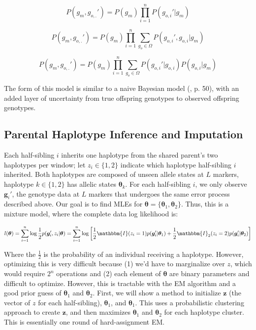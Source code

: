 \documentclass[11pt]{article}
\begin{document}
$$
P(g_m, g_{o,.}') = P(g_m) \prod_{i = 1}^n P(g_{o,i}' | g_m)
$$

$$
P(g_m, g_{o,.}') = P(g_m) \prod_{i = 1}^n \sum_{g_o \in \Omega} P(g_{o,i}', g_{o,i} | g_m)
$$

\begin{equation}
  P(g_m, g_{o,.}') = P(g_m) \prod_{i = 1}^n \sum_{g_o \in \Omega} P(g_{o,i}' | g_{o,i}) P(g_{o,i} | g_{m})
\end{equation}

The form of this model is similar to a naive Bayesian model
(\citealt{koller2009}, p. 50), with an added layer of uncertainty from true
offspring genotypes to observed offspring genotypes.

%
%

\subsection{Parental Haplotype Inference and Imputation}

Each half-sibling $i$ inherits one haplotype from the shared parent's two
haplotypes per window; let $z_i \in \{1, 2\}$ indicate which haplotype
half-sibling $i$ inherited. Both haplotypes are composed of unseen allele
states at $L$ markers, haplotype $k \in \{1, 2\}$ has allelic states
$\bm{\theta}_k$. For each half-sibling $i$, we only observe $\bm{g}_i'$, the
genotype data at $L$ markers that undergoes the same error process described
above. Our goal is to find MLEs for $\bm{\theta} = \{\bm{\theta}_1,
\bm{\theta}_2\}$. Thus, this is a mixture model, where the complete data log
likelihood is:

$$
l(\bm{\theta}) =  \sum_{i=1}^n \log \frac{1}{2} p(\bm{g}'_i, z_i | \bm{\theta}) = \sum_{i=1}^n \log \left[ \frac{1}{2}\mathbbm{I}(z_i = 1) p(\bm{g}'_i | \bm{\theta}_1) + \frac{1}{2}\mathbbm{I}_2(z_i = 2) p(\bm{g}'_i | \bm{\theta}_2) \right]
$$

Where the $\frac{1}{2}$ is the probability of an individual receiving a
haplotype. However, optimizing this is very difficult because (1) we'd have to
marginalize over $z$, which would require $2^n$ operations and (2) each element
of $\bm{\theta}$ are binary parameters and difficult to optimize. However, this
is tractable with the EM algorithm and a good prior guess of $\bm{\theta}_1$
and $\bm{\theta}_2$. First, we will show a method to initialize $\bm{z}$ (the
vector of $z$ for each half-sibling), $\bm{\theta}_1$, and $\bm{\theta}_1$.
This uses a probabilistic clustering approach to create $\bm{z}$, and then
maximizes $\bm{\theta}_1$ and $\bm{\theta}_2$ for each haplotype cluster. This
is essentially one round of hard-assignment EM.
\end{document}
